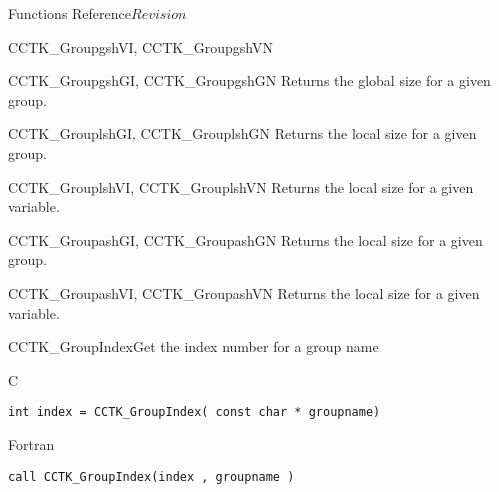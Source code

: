 \begin{cactuspart}{ Functions Reference}{}{$Revision$}
\begin{FunctionDescription}{CCTK\_GroupgshVI, CCTK\_GroupgshVN}
\begin{SeeAlsoSection}
\begin{SeeAlso}{CCTK\_GroupgshGI, CCTK\_GroupgshGN}
Returns the global size for a given group.
\end{SeeAlso}
\begin{SeeAlso}{CCTK\_GrouplshGI, CCTK\_GrouplshGN}
Returns the local size for a given group.
\end{SeeAlso}
\begin{SeeAlso}{CCTK\_GrouplshVI, CCTK\_GrouplshVN}
Returns the local size for a given variable.
\end{SeeAlso}
\begin{SeeAlso}{CCTK\_GroupashGI, CCTK\_GroupashGN}
Returns the local size for a given group.
\end{SeeAlso}
\begin{SeeAlso}{CCTK\_GroupashVI, CCTK\_GroupashVN}
Returns the local size for a given variable.
\end{SeeAlso}
\end{SeeAlsoSection}
\end{FunctionDescription}


\begin{FunctionDescription}{CCTK\_GroupIndex}{Get the index number for a group name}
\label{CCTK-GroupIndex}
\begin{SynopsisSection}
\begin{Synopsis}{C}
\begin{verbatim}int index = CCTK_GroupIndex( const char * groupname)\end{verbatim}
\end{Synopsis}
\begin{Synopsis}{Fortran}
\begin{verbatim}call CCTK_GroupIndex(index , groupname )


\end{verbatim}
\end{Synopsis}
\end{SynopsisSection}
\end{FunctionDescription}
\end{cactuspart}
